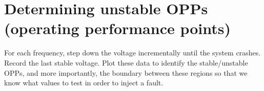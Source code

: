 \section{Determining unstable OPPs (operating performance points)}

For each frequency, step down the voltage incrementally until the system
crashes. Record the last stable voltage. Plot these data to identify the
stable/unstable OPPs, and more importantly, the boundary between these regions
so that we know what values to test in order to inject a fault.
